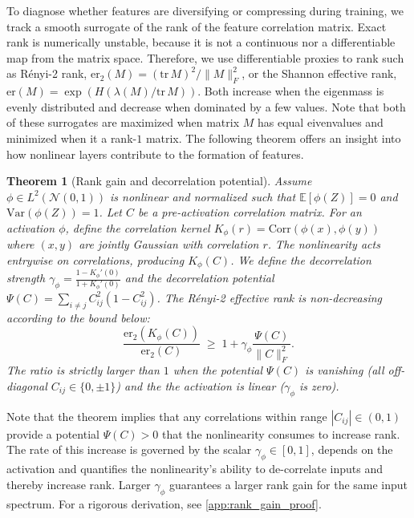 \documentclass{article}
\newtheorem{theorem}{Theorem}[section]
\numberwithin{figure}{section}
\begin{document}
To diagnose whether features are diversifying or compressing during training, we track a smooth surrogate of the rank of the feature correlation matrix. Exact rank is numerically unstable, because it is not a continuous nor a differentiable map from the matrix space. Therefore, we use differentiable proxies to rank such as Rényi-2 rank, $\mathrm{er}_2(M)=(\mathrm{tr}\,M)^2/\|M\|_F^2$, or the Shannon effective rank, $\mathrm{er}(M)=\exp(H(\lambda(M)/\mathrm{tr}\,M))$. Both increase when the eigenmass is evenly distributed and decrease when dominated by a few values. Note that both of these surrogates are maximized when matrix $M$ has equal eivenvalues and minimized when it a rank-$1$ matrix. The following theorem offers an insight into how nonlinear layers contribute to the formation of features. 


\begin{theorem}[Rank gain and decorrelation potential]
\label{thm:rank_gain}
Assume $\phi \in L^2(\mathcal{N}(0,1))$ is nonlinear and normalized such that $\mathbb{E}[\phi(Z)]=0$ and $\mathrm{Var}(\phi(Z))=1$. Let $C$ be a pre-activation correlation matrix. For an activation $\phi$, define the correlation kernel $K_\phi(r)=\mathrm{Corr}(\phi(x),\phi(y))$ where $(x,y)$ are jointly Gaussian with correlation $r$. The nonlinearity acts entrywise on correlations, producing $K_\phi(C)$. We define the \emph{decorrelation strength} $\gamma_\phi = \frac{1-K_\phi'(0)}{1+K_\phi'(0)}$ and the \emph{decorrelation potential} $\Psi(C) = \sum_{i \ne j} C_{ij}^2 (1-C_{ij}^2)$. The Rényi-2 effective rank is non-decreasing according to the bound below:
\[
\frac{\mathrm{er}_2(K_\phi(C))}{\mathrm{er}_2(C)}
\;\ge\; 1 + \gamma_\phi \frac{\Psi(C)}{\|C\|_F^2}.
\]
The ratio is strictly larger than $1$  when the potential $\Psi(C)$ is vanishing (all off-diagonal $C_{ij} \in \{0, \pm 1\}$) and the the activation is linear ($\gamma_\phi$ is zero).
\end{theorem}

Note that the theorem implies that any correlations within range $|C_{ij}|\in(0,1)$ provide a potential $\Psi(C) > 0$ that the nonlinearity consumes to increase rank. The rate of this increase is governed by the scalar $\gamma_\phi \in [0, 1]$, depends on the activation and quantifies the nonlinearity's  ability to de-correlate inputs and thereby increase rank. Larger $\gamma_\phi$ guarantees a larger rank gain for the same input spectrum. For a rigorous derivation, see \cref{app:rank_gain_proof}.

\vspace{-7pt}
\end{document}
